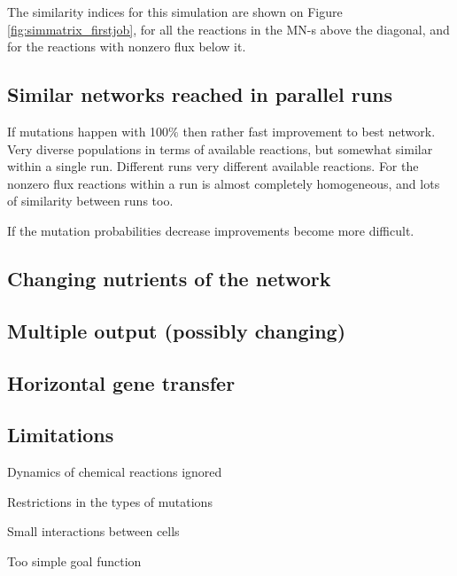 \documentclass[10pt,a4paper]{article}
\begin{document}
The similarity indices for this simulation are shown on Figure \ref{fig:simmatrix_firstjob}, for all the reactions in the MN-s above the diagonal, and for the reactions with nonzero flux below it. 


\subsection{Similar networks reached in parallel runs}
\label{sub:similar_networks_reached_in_paralell_runs}
If mutations happen with 100$\%$ then rather fast improvement to best network. Very diverse populations in terms of available reactions, but somewhat similar within a single run. Different runs very different available reactions. For the nonzero flux reactions within a run is almost completely homogeneous, and lots of similarity between runs too. 

If the mutation probabilities decrease improvements become more difficult.

\subsection{Changing nutrients of the network}
\label{sub:changing_nutrients_of_the_network}

\subsection{Multiple output (possibly changing)}
\label{sub:multiple_output_possibly_changing_}

\subsection{Horizontal gene transfer}
\label{sub:horizontal_gene_transfer}


\subsection{Limitations}
\label{sub:limitations}
Dynamics of chemical reactions ignored

Restrictions in the types of mutations

Small interactions between cells

Too simple goal function
\end{document}
